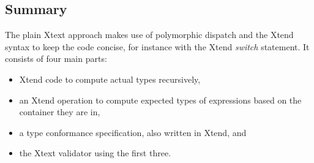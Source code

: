 

\subsection{Summary}
The plain Xtext approach makes use of polymorphic dispatch and the Xtend syntax
to keep the code concise, for instance with the Xtend \emph{switch} statement.
It consists of four main parts:
\begin{itemize}
\item Xtend code to compute actual types recursively,
\item an Xtend operation to compute expected types of expressions based on the container they are in,
\item a type conformance specification, also written in Xtend, and
\item the Xtext validator using the first three.
\end{itemize}

